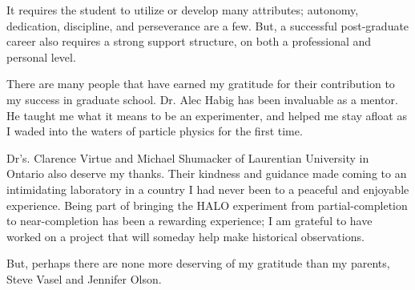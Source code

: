 %
%
%
%



 It requires the student to utilize or develop many attributes; autonomy, dedication, discipline, and perseverance are a few. But, a successful post-graduate career also requires a strong support structure, on both a professional and personal level. 

There are many people that have earned my gratitude for their contribution to my success in graduate school. Dr. Alec Habig has been invaluable as a mentor. He taught me what it means to be an experimenter, and helped me stay afloat as I waded into the waters of particle physics for the first time.

Dr's. Clarence Virtue and Michael Shumacker of Laurentian University in Ontario also deserve my thanks. Their kindness and guidance made coming to an intimidating laboratory in a country I had never been to a peaceful and enjoyable experience. Being part of bringing the HALO experiment from partial-completion to near-completion has been a rewarding experience; I am grateful to have worked on a project that will someday help make historical observations.

But, perhaps there are none more deserving of my gratitude than my parents, Steve Vasel and Jennifer Olson.  


